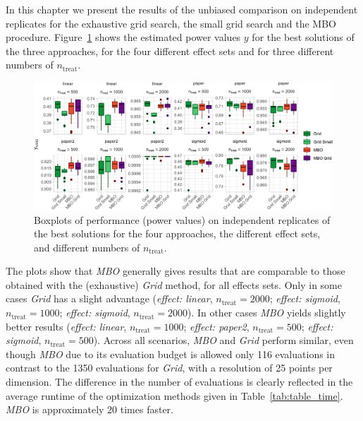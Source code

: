 \documentclass[bimj,fleqn]{w-art}
\theoremstyle{plain}
\theoremstyle{definition}
\begin{document}
In this chapter we present the results of the unbiased comparison on independent replicates for the exhaustive grid search, the small grid search and the MBO procedure.
Figure~\ref{fig:plot_boxplot_valid_y} shows the  estimated power values $y$ for the best solutions of the three approaches, for the four different effect sets and for three different numbers of $n_{\text{treat}}$.
\begin{figure}[htb]
\centering
\includegraphics[width=\linewidth]{generated/figures/plot_boxplot_valid_y.pdf}
\caption{%
  Boxplots of performance (power values) on independent replicates of the best solutions for the four approaches, the different effect sets, and different numbers of $n_{\text{treat}}$. %
  }
\label{fig:plot_boxplot_valid_y}
\end{figure}

The plots show that \emph{MBO} generally gives results that are comparable to those obtained with the (exhaustive) \emph{Grid} method, for all effects sets. Only in some cases \emph{Grid} has a slight advantage (\emph{effect: linear}, $n_{\text{treat}} = 2000$; \emph{effect: sigmoid}, $n_{\text{treat}} = 1000$; \emph{effect: sigmoid}, $n_{\text{treat}} = 2000$).
In other cases \emph{MBO} yields slightly better results (\emph{effect: linear}, $n_{\text{treat}} = 1000$; \emph{effect: paper2}, $n_{\text{treat}} = 500$; \emph{effect: sigmoid}, $n_{\text{treat}} = 500$).
Across all scenarios, \emph{MBO} and \emph{Grid} perform similar, even though \emph{MBO} due to its evaluation budget is allowed only 116 evaluations in contrast to the 1350 evaluations for \emph{Grid}, with a resolution of 25 points per dimension. 
The difference in the number of evaluations is clearly reflected in the average runtime of the optimization methods given in Table~\ref{tab:table_time}. \emph{MBO} is approximately 20 times faster.

\end{document}
